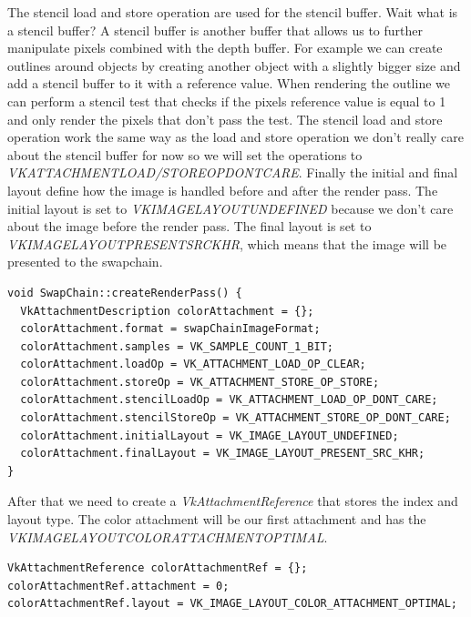 \documentclass[12pt]{report} \usepackage{preamble}
\begin{document}
The stencil load and store operation are used for the stencil buffer. Wait what is a stencil buffer? A stencil buffer
is another buffer that allows us to further manipulate pixels combined with the depth buffer. For example we can
create outlines around objects by creating another object with a slightly bigger size and add a stencil buffer to it with a
reference value. When rendering the outline we can perform a stencil test that checks if the pixels reference value is
equal to 1 and only render the pixels that don't pass the test. The stencil load and store operation work the same way
as the load and store operation we don't really care about the stencil buffer for now so we will set the operations to
\textit{VK\textunderscore ATTACHMENT\textunderscore LOAD/STORE\textunderscore OP\textunderscore DONT\textunderscore CARE}.
Finally the initial and final layout define how the image is handled before and after the render pass. The initial layout
is set to \textit{VK\textunderscore IMAGE\textunderscore LAYOUT\textunderscore UNDEFINED} because we don't care about the
image before the render pass. The final layout is set to
\textit{VK\textunderscore IMAGE\textunderscore LAYOUT\textunderscore PRESENT\textunderscore SRC\textunderscore KHR},
which means that the image will be presented to the swapchain.

\begin{lstlisting}[Language=C++]
void SwapChain::createRenderPass() {
  VkAttachmentDescription colorAttachment = {};
  colorAttachment.format = swapChainImageFormat;
  colorAttachment.samples = VK_SAMPLE_COUNT_1_BIT;
  colorAttachment.loadOp = VK_ATTACHMENT_LOAD_OP_CLEAR;
  colorAttachment.storeOp = VK_ATTACHMENT_STORE_OP_STORE;
  colorAttachment.stencilLoadOp = VK_ATTACHMENT_LOAD_OP_DONT_CARE;
  colorAttachment.stencilStoreOp = VK_ATTACHMENT_STORE_OP_DONT_CARE;
  colorAttachment.initialLayout = VK_IMAGE_LAYOUT_UNDEFINED;
  colorAttachment.finalLayout = VK_IMAGE_LAYOUT_PRESENT_SRC_KHR;
}
\end{lstlisting}

After that we need to create a \textit{VkAttachmentReference} that stores the index and layout type.
The color attachment will be our first attachment and has the \\
\textit{VK\textunderscore IMAGE\textunderscore LAYOUT\textunderscore COLOR\textunderscore ATTACHMENT\textunderscore OPTIMAL}.

\begin{lstlisting}[Language=C++]
VkAttachmentReference colorAttachmentRef = {};
colorAttachmentRef.attachment = 0;
colorAttachmentRef.layout = VK_IMAGE_LAYOUT_COLOR_ATTACHMENT_OPTIMAL;
\end{lstlisting}
\end{document}
